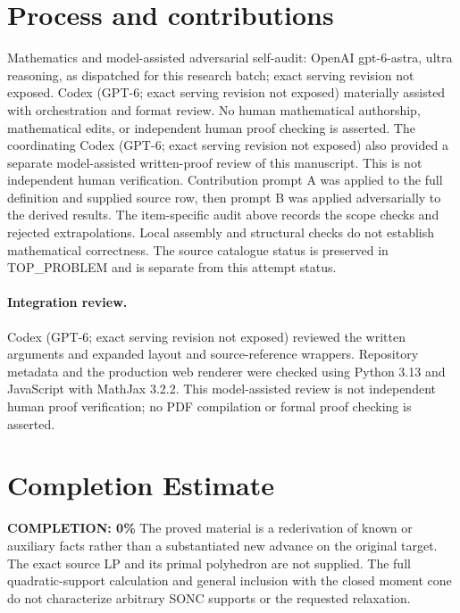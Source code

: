 \documentclass[11pt]{article}
\begin{document}
\section{Process and contributions}
Mathematics and model-assisted adversarial self-audit: OpenAI gpt-6-astra, ultra reasoning, as dispatched for this research batch; exact serving revision not exposed. Codex (GPT-6; exact serving revision not exposed) materially assisted with orchestration and format review. No human mathematical authorship, mathematical edits, or independent human proof checking is asserted.
The coordinating Codex (GPT-6; exact serving revision not exposed) also provided a separate model-assisted written-proof review of this manuscript. This is not independent human verification.
Contribution prompt A was applied to the full definition and supplied source row, then prompt B was applied adversarially to the derived results. The item-specific audit above records the scope checks and rejected extrapolations. Local assembly and structural checks do not establish mathematical correctness. The source catalogue status is preserved in TOP\_PROBLEM and is separate from this attempt status.
\paragraph{Integration review.} Codex (GPT-6; exact serving revision not exposed) reviewed the written arguments and expanded layout and source-reference wrappers. Repository metadata and the production web renderer were checked using Python 3.13 and JavaScript with MathJax 3.2.2. This model-assisted review is not independent human proof verification; no PDF compilation or formal proof checking is asserted.

\section{Completion Estimate}
\noindent\textbf{COMPLETION: 0\%}
The proved material is a rederivation of known or auxiliary facts rather than a substantiated new advance on the original target. The exact source LP and its primal polyhedron are not supplied. The full quadratic-support calculation and general inclusion with the closed moment cone do not characterize arbitrary SONC supports or the requested relaxation.
\end{document}

